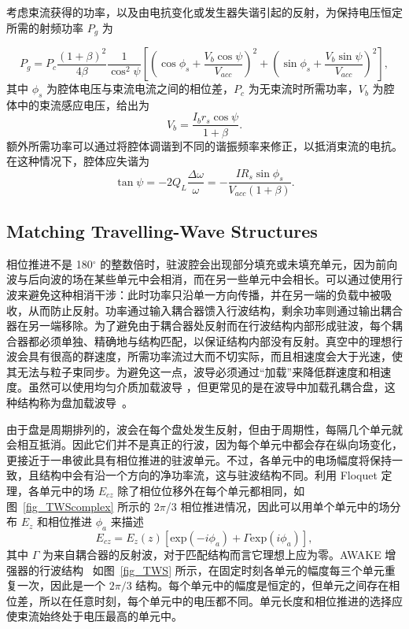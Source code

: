 \documentclass{cernyrep}
\begin{document}
考虑束流获得的功率，以及由电抗变化或发生器失谐引起的反射，为保持电压恒定所需的射频功率 $P_g$ 为 \cite{wangler}

\begin{equation}
P_g = P_c \frac{(1+\beta)^2}{4 \beta} \frac{1}{\cos^2 \psi} \left[ \left( \cos \phi_s +\frac{V_b \cos \psi}{V_{acc}} \right)^2 +\left( \sin \phi_s +\frac{V_b \sin \psi}{V_{acc}} \right)^2 \right],
\end{equation}
其中 $\phi_s$ 为腔体电压与束流电流之间的相位差，$P_c$ 为无束流时所需功率，$V_b$ 为腔体中的束流感应电压，给出为
\begin{equation}
V_b = \frac{I_b r_s \cos \psi}{1+\beta}.
\end{equation}
额外所需功率可以通过将腔体调谐到不同的谐振频率来修正，以抵消束流的电抗。在这种情况下，腔体应失谐为
\begin{equation}
\tan{\psi}=-2 Q_L \frac{\Delta \omega }{\omega}= - \frac{I R_s \sin{\phi_s}}{V_{acc} (1+ \beta)}.
\end{equation}

\subsection{Matching Travelling-Wave Structures} 

相位推进不是 180$^\circ$ 的整数倍时，驻波腔会出现部分填充或未填充单元，因为前向波与后向波的场在某些单元中会相消，而在另一些单元中会相长。可以通过使用行波来避免这种相消干涉：此时功率只沿单一方向传播，并在另一端的负载中被吸收，从而防止反射。功率通过输入耦合器馈入行波结构，剩余功率则通过输出耦合器在另一端移除。为了避免由于耦合器处反射而在行波结构内部形成驻波，每个耦合器都必须单独、精确地与结构匹配，以保证结构内部没有反射。真空中的理想行波会具有很高的群速度，所需功率流过大而不切实际，而且相速度会大于光速，使其无法与粒子束同步。为避免这一点，波导必须通过“加载”来降低群速度和相速度。虽然可以使用均匀介质加载波导 \cite{DLATHz}，但更常见的是在波导中加载孔耦合盘，这种结构称为盘加载波导~\cite{TWS}。

由于盘是周期排列的，波会在每个盘处发生反射，但由于周期性，每隔几个单元就会相互抵消。因此它们并不是真正的行波，因为每个单元中都会存在纵向场变化，更接近于一串彼此具有相位推进的驻波单元。不过，各单元中的电场幅度将保持一致，且结构中会有沿一个方向的净功率流，这与驻波结构不同。利用 Floquet 定理，各单元中的场 $E_{cz}$ 除了相位位移外在每个单元都相同，如图~\ref{fig_TWScomplex} 所示的 2$\pi$/3 相位推进情况，因此可以用单个单元中的场分布 $E_z$ 和相位推进 $\phi_a$ 来描述 \cite{Kroll}
\begin{equation}
E_{cz} =E_z (z)[\textrm{exp}(-i \phi_a) + \Gamma \textrm{exp}(i \phi_a)],
\end{equation}
其中 $\Gamma$ 为来自耦合器的反射波，对于匹配结构而言它理想上应为零。AWAKE 增强器的行波结构~\cite{AWAKEboost} 如图~\ref{fig_TWS} 所示，在固定时刻各单元的幅度每三个单元重复一次，因此是一个 $2 \pi / 3$ 结构。每个单元中的幅度是恒定的，但单元之间存在相位差，所以在任意时刻，每个单元中的电压都不同。单元长度和相位推进的选择应使束流始终处于电压最高的单元中。
\end{document}
